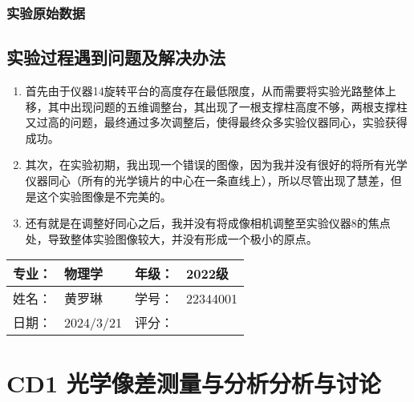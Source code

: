 \documentclass[dvipsnames, svgnames,a4paper,11pt]{article}
\begin{document}
\subsubsection{实验原始数据}

	

	
	\subsection{实验过程遇到问题及解决办法}
	\begin{enumerate}
		\item 首先由于仪器14旋转平台的高度存在最低限度，从而需要将实验光路整体上移，其中出现问题的五维调整台，其出现了一根支撑柱高度不够，两根支撑柱又过高的问题，最终通过多次调整后，使得最终众多实验仪器同心，实验获得成功。
		\item 其次，在实验初期，我出现一个错误的图像，因为我并没有很好的将所有光学仪器同心（所有的光学镜片的中心在一条直线上），所以尽管出现了慧差，但是这个实验图像是不完美的。
		\item 还有就是在调整好同心之后，我并没有将成像相机调整至实验仪器8的焦点处，导致整体实验图像较大，并没有形成一个极小的原点。
		
		
		
	

	
	\end{enumerate}
	
	
	
	\clearpage
	
	\begin{table}
		\renewcommand\arraystretch{1.7}
		\begin{tabularx}{\textwidth}{|X|X|X|X|}
			\hline
			专业：& 物理学 &年级：& 2022级\\
			\hline
			姓名： &  黄罗琳& 学号：&22344001 \\
			\hline
			日期：& 2024/3/21 & 评分： &   \\
			\hline
		\end{tabularx}
	\end{table}
	
	\section{CD1 光学像差测量与分析\quad\heiti 分析与讨论}
	
\end{document}
